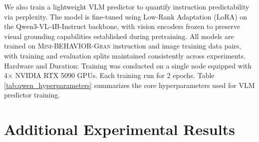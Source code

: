 We also train a lightweight VLM predictor to quantify instruction predictability via perplexity. The model is fine-tuned using Low-Rank Adaptation (LoRA) on the Qwen3-VL-4B-Instruct backbone, with vision encoders frozen to preserve visual grounding capabilities established during pretraining. All models are trained on \textsc{Mini-BEHAVIOR-Gran} instruction and image training data pairs, with training and evaluation splits maintained consistently across experiments. Hardware and Duration: Training was conducted on a single node equipped with 4$\times$ NVIDIA RTX 5090 GPUs. Each training run for 2 epochs. Table \ref{tab:qwen_hyperparameters} summarizes the core hyperparameters used for VLM predictor training.

\begin{table}[H]
\centering
\caption{Hyperparameters for Qwen3-VL-4B-Instruct fine-tuning on \textsc{Mini-BEHAVIOR-Gran} (High-domain).}
\label{tab:qwen_hyperparameters}
\end{table}



\section{Additional Experimental Results}
\label{app_sec:additional_experimental_results}

